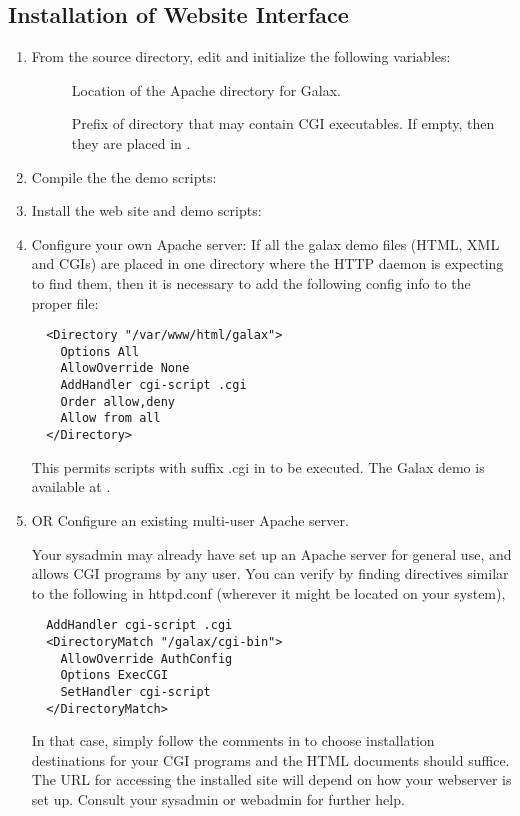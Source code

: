 \subsection{Installation of Website Interface}
\begin{enumerate}
\item From the source directory, edit
 and initialize the following
variables:
\begin{description}
\item[]   Location of the Apache directory for Galax.
\item[] Prefix of directory that may contain CGI
  executables.  If empty, then they are placed in . 
\end{description}
\item Compile the the demo scripts: 
\item Install the web site and demo scripts: 

\item Configure your own Apache server: If all the galax demo files
     (HTML, XML and CGIs) are placed in one directory where the HTTP
     daemon is expecting to find them, then it is necessary to add the
     following config info to the proper  file:
\begin{verbatim}
  <Directory "/var/www/html/galax">
    Options All
    AllowOverride None
    AddHandler cgi-script .cgi 
    Order allow,deny
    Allow from all
  </Directory>
\end{verbatim}
     This permits scripts with suffix .cgi in
      to be executed.  The Galax demo is
     available at .
\item OR Configure an existing multi-user Apache server.

     Your sysadmin may already have set up an Apache server for
     general use, and allows CGI programs by any user.  You can verify
     by finding directives similar to the following in httpd.conf
     (wherever it might be located on your system),

\begin{verbatim}
  AddHandler cgi-script .cgi
  <DirectoryMatch "/galax/cgi-bin">
    AllowOverride AuthConfig
    Options ExecCGI
    SetHandler cgi-script
  </DirectoryMatch>
\end{verbatim}

In that case, simply follow the comments in
 to choose installation destinations for
your CGI programs and the HTML documents should suffice.  The URL for
accessing the installed site will depend on how your webserver is set
up.  Consult your sysadmin or webadmin for further help.
\end{enumerate}
